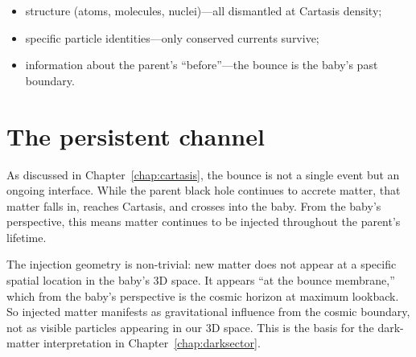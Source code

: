 \begin{itemize}
  \item structure (atoms, molecules, nuclei)---all dismantled at Cartasis density;
  \item specific particle identities---only conserved currents survive;
  \item information about the parent's ``before''---the bounce is the baby's past
    boundary.
\end{itemize}

\section{The persistent channel}

As discussed in Chapter~\ref{chap:cartasis}, the bounce is not a single event
but an ongoing interface. While the parent black hole continues to accrete
matter, that matter falls in, reaches Cartasis, and crosses into the baby. From
the baby's perspective, this means matter continues to be injected throughout
the parent's lifetime.

The injection geometry is non-trivial: new matter does not appear at a specific
spatial location in the baby's 3D space. It appears ``at the bounce membrane,''
which from the baby's perspective is the cosmic horizon at maximum lookback. So
injected matter manifests as gravitational influence from the cosmic boundary,
not as visible particles appearing in our 3D space. This is the basis for the
dark-matter interpretation in Chapter~\ref{chap:darksector}.

